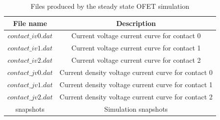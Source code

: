 \begin{table}[H]
\begin{center}
\begin{tabular}{ |c|c| } 
 \hline
	File name 			& 	Description  \\ 
 \hline
	$contact\_iv0.dat$	&	Current voltage current curve for contact 0 \\ 
	$contact\_iv1.dat$	&	Current voltage current curve for contact 1 \\ 
	$contact\_iv2.dat$	&	Current voltage current curve for contact 2 \\ 
	$contact\_jv0.dat$	&	Current density voltage current curve for contact 0 \\
	$contact\_jv1.dat$	&	Current density voltage current curve for contact 1 \\
	$contact\_jv2.dat$	&	Current density voltage current curve for contact 2 \\
	snapshots	&	Simulation snapshots \\
 \hline
\end{tabular}
\caption{Files produced by the steady state OFET simulation}
\label{tab:ofet_jv_output}
\end{center}
\end{table}

